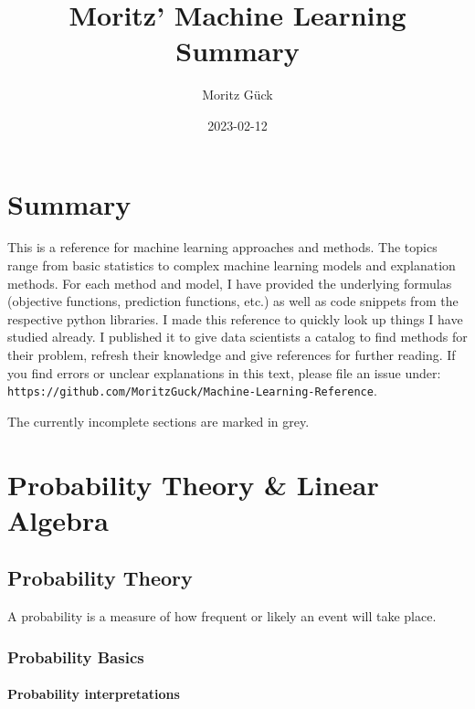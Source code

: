 \documentclass[
]{book}
\title{Moritz' Machine Learning Summary}
\author{Moritz Gück}
\date{2023-02-12}
\begin{document}
\maketitle

{
\setcounter{tocdepth}{1}
\tableofcontents
}
\hypertarget{summary}{%
\chapter*{Summary}\label{summary}}

This is a reference for machine learning approaches and methods. The
topics range from basic statistics to complex machine learning models
and explanation methods. For each method and model, I have provided the
underlying formulas (objective functions, prediction functions, etc.) as
well as code snippets from the respective python libraries. I made this
reference to quickly look up things I have studied already. I published
it to give data scientists a catalog to find methods for their problem,
refresh their knowledge and give references for further reading. If you
find errors or unclear explanations in this text, please file an issue
under: \texttt{https://github.com/MoritzGuck/Machine-Learning-Reference}.

The currently incomplete sections are marked in grey.

\hypertarget{probability-theory-linear-algebra}{%
\chapter{Probability Theory \& Linear Algebra}\label{probability-theory-linear-algebra}}

\hypertarget{probability-theory}{%
\section{Probability Theory}\label{probability-theory}}

A probability is a measure of how frequent or likely an event will take
place.

\hypertarget{probability-basics}{%
\subsection{Probability Basics}\label{probability-basics}}

\hypertarget{probability-interpretations}{%
\subsubsection{Probability interpretations}\label{probability-interpretations}}
\end{document}
